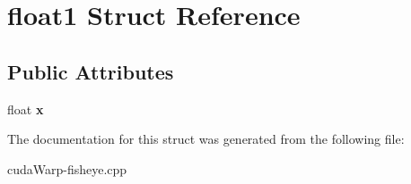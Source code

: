 \hypertarget{structfloat1}{}\section{float1 Struct Reference}
\label{structfloat1}
\subsection*{Public Attributes}
\begin{DoxyCompactItemize}
\item 
float {\bfseries x}\hypertarget{structfloat1_a97bf844de72b1f2bfc5aed6edd9b4dd0}{}\label{structfloat1_a97bf844de72b1f2bfc5aed6edd9b4dd0}

\end{DoxyCompactItemize}


The documentation for this struct was generated from the following file\+:\begin{DoxyCompactItemize}
\item 
cuda\+Warp-\/fisheye.\+cpp\end{DoxyCompactItemize}

